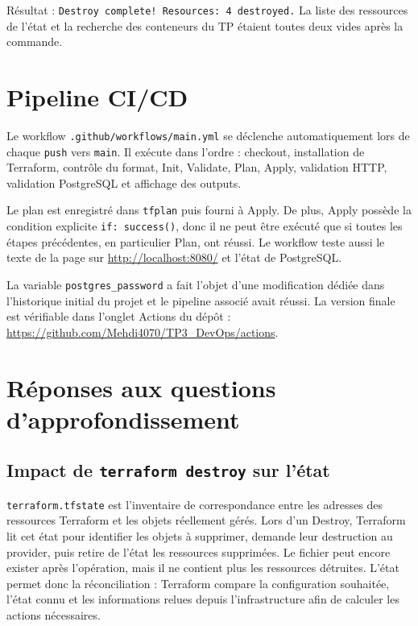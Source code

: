 \documentclass[11pt,a4paper]{article}
\begin{document}
Résultat : \texttt{Destroy complete! Resources: 4 destroyed.} La liste des ressources
de l'état et la recherche des conteneurs du TP étaient toutes deux vides après la
commande.

\section{Pipeline CI/CD}

Le workflow \texttt{.github/workflows/main.yml} se déclenche automatiquement lors de
chaque \texttt{push} vers \texttt{main}. Il exécute dans l'ordre : checkout, installation
de Terraform, contrôle du format, Init, Validate, Plan, Apply, validation HTTP,
validation PostgreSQL et affichage des outputs.

Le plan est enregistré dans \texttt{tfplan} puis fourni à Apply. De plus, Apply possède
la condition explicite \texttt{if: success()}, donc il ne peut être exécuté que si toutes
les étapes précédentes, en particulier Plan, ont réussi. Le workflow teste aussi le
texte de la page sur \url{http://localhost:8080/} et l'état de PostgreSQL.

La variable \texttt{postgres\_password} a fait l'objet d'une modification dédiée dans
l'historique initial du projet et le pipeline associé avait réussi. La version finale
est vérifiable dans l'onglet Actions du dépôt :
\url{https://github.com/Mehdi4070/TP3_DevOps/actions}.

\section{Réponses aux questions d'approfondissement}

\subsection{Impact de \texttt{terraform destroy} sur l'état}

\texttt{terraform.tfstate} est l'inventaire de correspondance entre les adresses des
ressources Terraform et les objets réellement gérés. Lors d'un Destroy, Terraform lit
cet état pour identifier les objets à supprimer, demande leur destruction au provider,
puis retire de l'état les ressources supprimées. Le fichier peut encore exister après
l'opération, mais il ne contient plus les ressources détruites. L'état permet donc la
réconciliation : Terraform compare la configuration souhaitée, l'état connu et les
informations relues depuis l'infrastructure afin de calculer les actions nécessaires.
\end{document}

